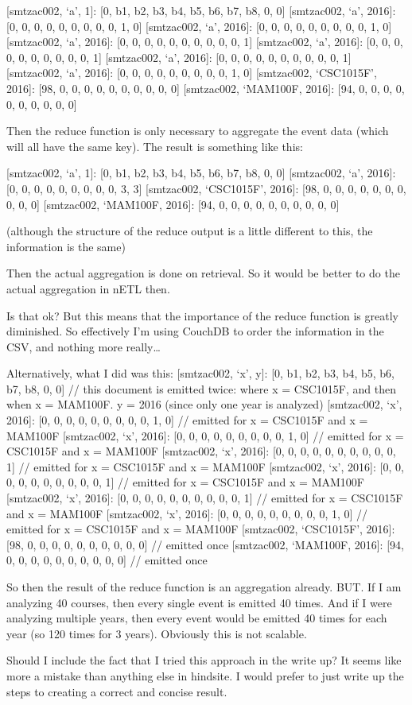     [smtzac002, ‘a’, 1]: [0, b1, b2, b3, b4, b5, b6, b7, b8, 0, 0]
[smtzac002, ‘a’, 2016]: [0, 0, 0, 0, 0, 0, 0, 0, 0, 1, 0]
[smtzac002, ‘a’, 2016]: [0, 0, 0, 0, 0, 0, 0, 0, 0, 1, 0]
[smtzac002, ‘a’, 2016]: [0, 0, 0, 0, 0, 0, 0, 0, 0, 0, 1]
[smtzac002, ‘a’, 2016]: [0, 0, 0, 0, 0, 0, 0, 0, 0, 0, 1]
[smtzac002, ‘a’, 2016]: [0, 0, 0, 0, 0, 0, 0, 0, 0, 0, 1]
[smtzac002, ‘a’, 2016]: [0, 0, 0, 0, 0, 0, 0, 0, 0, 1, 0]
[smtzac002, ‘CSC1015F’, 2016]: [98, 0, 0, 0, 0, 0, 0, 0, 0, 0, 0]
[smtzac002, ‘MAM100F, 2016]: [94, 0, 0, 0, 0, 0, 0, 0, 0, 0, 0]

Then the reduce function is only necessary to aggregate the event data (which will all have the same key). The result is something like this:

[smtzac002, ‘a’, 1]: [0, b1, b2, b3, b4, b5, b6, b7, b8, 0, 0]
[smtzac002, ‘a’, 2016]: [0, 0, 0, 0, 0, 0, 0, 0, 0, 3, 3]
[smtzac002, ‘CSC1015F’, 2016]: [98, 0, 0, 0, 0, 0, 0, 0, 0, 0, 0]
[smtzac002, ‘MAM100F, 2016]: [94, 0, 0, 0, 0, 0, 0, 0, 0, 0, 0]

(although the structure of the reduce output is a little different to this, the information is the same)

Then the actual aggregation is done on retrieval. So it would be better to do the actual aggregation in nETL then.

Is that ok? But this means that the importance of the reduce function is greatly diminished. So effectively I’m using CouchDB to order the information in the CSV, and nothing more really…

Alternatively, what I did was this:
[smtzac002, ‘x’, y]: [0, b1, b2, b3, b4, b5, b6, b7, b8, 0, 0] // this document is emitted twice: where x = CSC1015F, and then when x = MAM100F. y = 2016 (since only one year is analyzed)
[smtzac002, ‘x’, 2016]: [0, 0, 0, 0, 0, 0, 0, 0, 0, 1, 0] // emitted for x = CSC1015F and x = MAM100F
    [smtzac002, ‘x’, 2016]: [0, 0, 0, 0, 0, 0, 0, 0, 0, 1, 0] // emitted for x = CSC1015F and x = MAM100F
    [smtzac002, ‘x’, 2016]: [0, 0, 0, 0, 0, 0, 0, 0, 0, 0, 1] // emitted for x = CSC1015F and x = MAM100F
    [smtzac002, ‘x’, 2016]: [0, 0, 0, 0, 0, 0, 0, 0, 0, 0, 1] // emitted for x = CSC1015F and x = MAM100F
    [smtzac002, ‘x’, 2016]: [0, 0, 0, 0, 0, 0, 0, 0, 0, 0, 1] // emitted for x = CSC1015F and x = MAM100F
    [smtzac002, ‘x’, 2016]: [0, 0, 0, 0, 0, 0, 0, 0, 0, 1, 0] // emitted for x = CSC1015F and x = MAM100F
    [smtzac002, ‘CSC1015F’, 2016]: [98, 0, 0, 0, 0, 0, 0, 0, 0, 0, 0] // emitted once
    [smtzac002, ‘MAM100F, 2016]: [94, 0, 0, 0, 0, 0, 0, 0, 0, 0, 0] // emitted once


So then the result of the reduce function is an aggregation already. BUT. If I am analyzing 40 courses, then every single event is emitted 40 times. And if I were analyzing multiple years, then every event would be emitted 40 times for each year (so 120 times for 3 years). Obviously this is not scalable.

Should I include the fact that I tried this approach in the write up? It seems like more a mistake than anything else in hindsite. I would prefer to just write up the steps to creating a correct and concise result.
